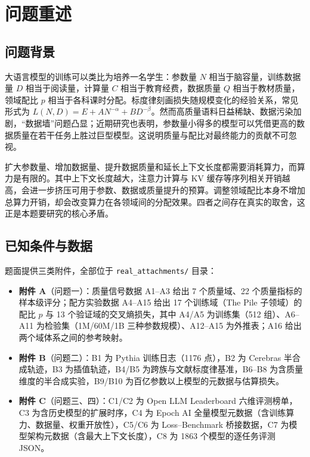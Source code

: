 \section{问题重述}

\subsection{问题背景}

大语言模型的训练可以类比为培养一名学生：参数量 $N$ 相当于脑容量，训练数据量 $D$ 相当于阅读量，计算量 $C$ 相当于教育经费，数据质量 $Q$ 相当于教材质量，领域配比 $p$ 相当于各科课时分配。标度律刻画损失随规模变化的经验关系，常见形式为 $L(N,D)=E+AN^{-\alpha}+BD^{-\beta}$。然而高质量语料日益稀缺、数据污染加剧，``数据墙''问题凸显；近期研究也表明，参数量小得多的模型可以凭借更高的数据质量在若干任务上胜过巨型模型\cite{asai2026synthesizing}。这说明质量与配比对最终能力的贡献不可忽视。

扩大参数量、增加数据量、提升数据质量和延长上下文长度都需要消耗算力，而算力是有限的。其中上下文长度越大，注意力计算与 KV 缓存等序列相关开销越高，会进一步挤压可用于参数、数据或质量提升的预算。调整领域配比本身不增加总算力开销，却会改变算力在各领域间的分配效果。四者之间存在真实的取舍，这正是本题要研究的核心矛盾。

\subsection{已知条件与数据}

题面提供三类附件，全部位于 \texttt{real\_attachments/} 目录：

\begin{itemize}[leftmargin=2em,itemsep=2pt]
\item \textbf{附件 A}（问题一）：质量信号数据 A1--A3 给出 7 个质量域、22 个质量指标的样本级评分；配方实验数据 A4--A15 给出 17 个训练域（The Pile 子领域）的配比 $p$ 与 13 个验证域的交叉熵损失，其中 A4/A5 为训练集（512 组）、A6--A11 为检验集（1M/60M/1B 三种参数规模）、A12--A15 为外推表；A16 给出两个域体系之间的参考映射。
\item \textbf{附件 B}（问题二）：B1 为 Pythia 训练日志（1176 点），B2 为 Cerebras 半合成轨迹，B3 为插值轨迹，B4/B5 为跨族与文献标度律基准，B6--B8 为含质量维度的半合成实验，B9/B10 为百亿参数以上模型的元数据与估算损失。
\item \textbf{附件 C}（问题三、四）：C1/C2 为 Open LLM Leaderboard 六维评测榜单，C3 为含历史模型的扩展时序，C4 为 Epoch AI 全量模型元数据（含训练算力、数据量、权重开放性），C5/C6 为 Loss--Benchmark 桥接数据，C7 为模型架构元数据（含最大上下文长度），C8 为 1863 个模型的逐任务评测 JSON。
\end{itemize}


